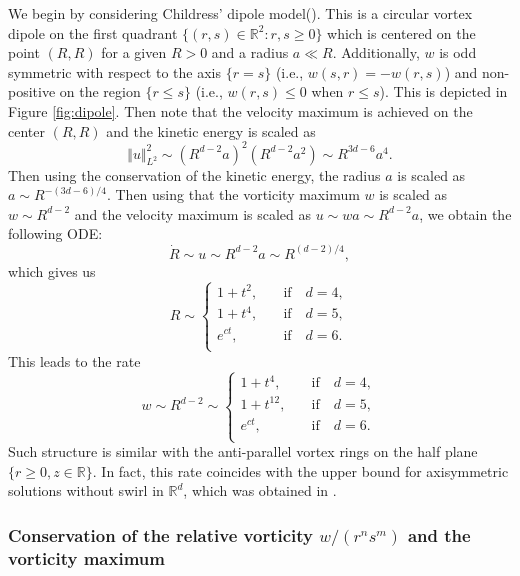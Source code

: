 \documentclass[11pt]{amsart}
\theoremstyle{definition}
\theoremstyle{remark}
\numberwithin{equation}{section}
\numberwithin{equation}{section}
\newcommand{\nrm}[1]{\Vert#1\Vert}
\newcommand{\0}{\emptyset}
\newcommand{\bbR}{\mathbb R}
\begin{document}
	We begin by considering Childress' dipole model(\cite{Child08, ChilGil1}). This is a circular vortex dipole on the first quadrant $\{ (r,s)\in\bbR^{2} : r,s\geq0\}$ which is centered on the point $(R,R)$ for a given $R>0$ and a radius $a\ll R$. Additionally, $w$ is odd symmetric with respect to the axis $\{r=s\}$ (i.e., $w(s,r)=-w(r,s)$) and non-positive on the region $\{r\leq s \}$ (i.e., $w(r,s)\leq 0$ when $r\leq s$). This is depicted in Figure \ref{fig:dipole}. Then note that the velocity maximum is achieved on the center $(R,R)$ and the kinetic energy is scaled as
	\begin{equation}
		\nrm{u}_{L^{2}}^{2}\sim (R^{d-2}a)^{2}(R^{d-2}a^{2})\sim R^{3d-6}a^{4}.
	\end{equation} Then using the conservation of the kinetic energy, the radius $a$ is scaled as $a\sim R^{-(3d-6)/4}$. Then using that the vorticity maximum $w$ is scaled as $w\sim R^{d-2}$ and the velocity maximum is scaled as $u\sim wa\sim R^{d-2}a$, we obtain the following ODE:
	\begin{equation}
		\dot{R}\sim u\sim R^{d-2}a\sim R^{(d-2)/4},
	\end{equation}
	which gives us
	\begin{equation}
		R\sim \begin{cases}
			1+t^{2},&\quad\text{if}\quad d=4,\\
			1+t^{4},&\quad\text{if}\quad d=5,\\
			e^{ct},&\quad\text{if}\quad d=6.\\
		\end{cases}
	\end{equation}
	This leads to the rate
	\begin{equation}
		w\sim R^{d-2}\sim \begin{cases}
			1+t^{4},&\quad\text{if}\quad d=4,\\
			1+t^{12},&\quad\text{if}\quad d=5,\\
			e^{ct},&\quad\text{if}\quad d=6.\\
		\end{cases}
	\end{equation}
	Such structure is similar with the anti-parallel vortex rings on the half plane $\{r\geq0, z\in \bbR\}$. In fact, this rate coincides with the upper bound for axisymmetric solutions without swirl in $\bbR^{d}$, which was obtained in \cite{SWZ25}.
	
	\subsubsection{Conservation of the relative vorticity $w/(r^{n}s^{m})$ and the vorticity maximum}
	
\end{document}
